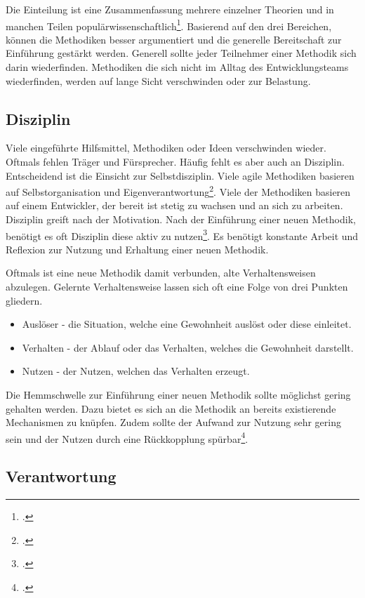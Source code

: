 Die Einteilung ist eine Zusammenfassung mehrere einzelner Theorien und in manchen Teilen populärwissenschaftlich\footcite[vgl.][]{drive-scholarly-review}. Basierend auf den drei Bereichen, können die Methodiken besser argumentiert und die generelle Bereitschaft zur Einführung gestärkt werden. Generell sollte jeder Teilnehmer einer Methodik sich darin wiederfinden. Methodiken die sich nicht im Alltag des Entwicklungsteams wiederfinden, werden auf lange Sicht verschwinden oder zur Belastung.

\subsection{Disziplin}

Viele eingeführte Hilfsmittel, Methodiken oder Ideen verschwinden wieder. Oftmals fehlen Träger und Fürsprecher. Häufig fehlt es aber auch an Disziplin. Entscheidend ist die Einsicht zur Selbstdisziplin. Viele agile Methodiken basieren auf Selbstorganisation und Eigenverantwortung\footcite[vgl.][]{codingame-agile-failed}. Viele der Methodiken basieren auf einem Entwickler, der bereit ist stetig zu wachsen und an sich zu arbeiten.
Disziplin greift nach der Motivation. Nach der Einführung einer neuen Methodik, benötigt es oft Disziplin diese aktiv zu nutzen\footcite[vgl.][]{screw-motivation}. Es benötigt konstante Arbeit und Reflexion zur Nutzung und Erhaltung einer neuen Methodik.

Oftmals ist eine neue Methodik damit verbunden, alte Verhaltensweisen abzulegen.
Gelernte Verhaltensweise lassen sich oft eine Folge von drei Punkten gliedern.
\begin{itemize}
\item Auslöser - die Situation, welche eine Gewohnheit auslöst oder diese einleitet.
\item Verhalten - der Ablauf oder das Verhalten, welches die Gewohnheit darstellt.
\item Nutzen - der Nutzen, welchen das Verhalten erzeugt.
\end{itemize}
Die Hemmschwelle zur Einführung einer neuen Methodik sollte möglichst gering gehalten werden. Dazu bietet es sich an die Methodik an bereits existierende Mechanismen zu knüpfen. Zudem sollte der Aufwand zur Nutzung sehr gering sein und der Nutzen durch eine Rückkopplung spürbar\footcite[vgl.][]{steps-of-habit}.

\subsection{Verantwortung}


